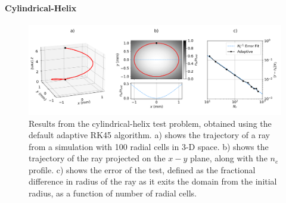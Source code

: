 \paragraph*{Cylindrical-Helix}

\begin{figure}[t!]
    \includegraphics[width=\linewidth]{Numerics/Images/cyl_helix.png}
    \centering
    \caption{Results from the cylindrical-helix test problem, obtained using the default adaptive RK45 algorithm.
    a) shows the trajectory of a ray from a simulation with 100 radial cells in 3-D space.
    b) shows the trajectory of the ray projected on the $x-y$ plane, along with the $n_e$ profile.
    c) shows the error of the test, defined as the fractional difference in radius of the ray as it exits the domain from the initial radius, as a function of number of radial cells.}%
    \label{fig:SOLAS_cylhelix}
\end{figure}

